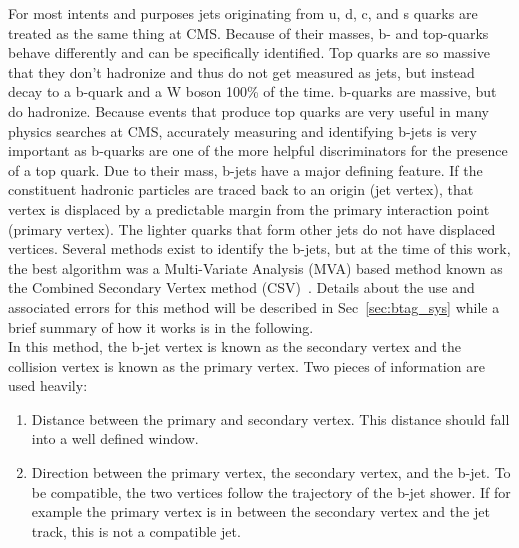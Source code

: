 	For most intents and purposes jets originating from u, d, c, and s quarks are treated as the same thing at CMS. Because of their masses, b- and top-quarks behave differently and can be specifically identified. Top quarks are so massive that they don't hadronize and thus do not get measured as jets, but instead decay to a b-quark and a W boson 100\% of the time. b-quarks are massive, but do hadronize. Because events that produce top quarks are very useful in many physics searches at CMS, accurately measuring and identifying b-jets is very important as b-quarks are one of the more helpful discriminators for the presence of a top quark. Due to their mass, b-jets have a major defining feature. If the constituent hadronic particles are traced back to an origin (jet vertex), that vertex is displaced by a predictable margin from the primary interaction point (primary vertex). The lighter quarks that form other jets do not have displaced vertices. Several methods exist to identify the b-jets, but at the time of this work, the best algorithm was a Multi-Variate Analysis (MVA) based method known as the Combined Secondary Vertex method (CSV)~\cite{btagging}. Details about the use and associated errors for this method will be described in Sec~\ref{sec:btag_sys} while a brief summary of how it works is in the following.\\
	
	In this method, the b-jet vertex is known as the secondary vertex and the collision vertex is known as the primary vertex. Two pieces of information are used heavily:
	\begin{enumerate}
	\item Distance between the primary and secondary vertex. This distance should fall into a well defined window.\\
	\item Direction between the primary vertex, the secondary vertex, and the b-jet. To be compatible, the two vertices follow the trajectory of the b-jet shower. If for example the primary vertex is in between the secondary vertex and the jet track, this is not a compatible jet.\\
	\end{enumerate}
	
